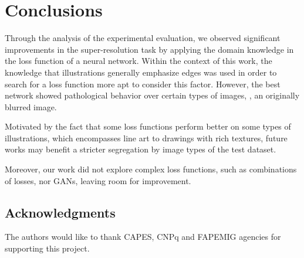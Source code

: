 \section{Conclusions}

Through the analysis of the experimental evaluation, we observed significant improvements in the super-resolution task by applying the domain knowledge in the loss function of a  neural network. Within the context of this work, the knowledge that illustrations generally emphasize edges was used in order to search for a loss function more apt to consider this factor.
However, the best network showed pathological behavior over certain types of images, \eg, an originally blurred image.


Motivated by the fact that some loss functions perform better on some types of illustrations, which encompasses line art to drawings with rich textures, future works may benefit a stricter segregation by image types of the test dataset.

Moreover, our work did not explore complex loss functions, such as combinations of losses, nor GANs, leaving room for improvement.

\subsection*{Acknowledgments}

The authors would like to thank CAPES, CNPq and FAPEMIG agencies for supporting this project.